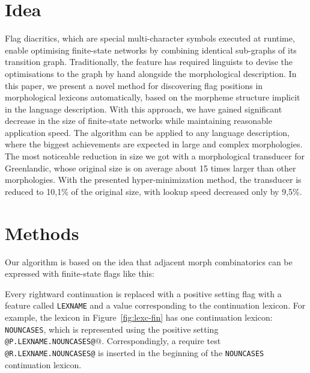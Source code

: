 \documentclass[final]{beamer}
\author{Senka Drobac$^1$, \\ Krister Lind\'{e}n$^1$, \\ Miikka Silfverberg$^1$, \\ Tommi A Pirinen$^2$}
\institute{$^1$University of Helsinki \\ Department of Modern Languages, PO Box 24 %
\\ $^2$University of Helsinki \\ Department of Speech Sciences, PO Box 9}
\begin{document}
\begin{poster}


\newcolumn


\section{Idea}
\justifying
Flag diacritics, which are special multi-character symbols executed at runtime, enable optimising finite-state networks by
    combining identical sub-graphs of its transition
    graph. Traditionally, the feature has required linguists to devise
    the optimisations to the graph by hand alongside the morphological
    description. In this paper, we present a novel method for
    discovering flag positions in morphological lexicons automatically,
    based on the morpheme structure implicit in the language
    description. With this approach, we have gained significant
    decrease in the size of finite-state networks while maintaining reasonable application 
    speed. The algorithm can be applied to any language description, where the biggest achievements are expected in large and complex morphologies. The most noticeable reduction in size we got with a morphological transducer for Greenlandic, whose original size is on average about 15 times larger than other morphologies. With the presented hyper-minimization method, the transducer is reduced to 10,1\% of the original size, with lookup speed decreased only by 9,5\%. 

\section{Methods}
\justifying
Our algorithm is based on the idea that adjacent morph combinatorics can be expressed with finite-state flags like this:

Every rightward continuation is replaced with a positive setting flag
with a feature called \texttt{LEXNAME} and a value corresponding to the
continuation lexicon. For example, the lexicon in
Figure~\ref{fig:lexc-fin} has one continuation lexicon: \texttt{NOUNCASES}, which is represented using the positive setting \verb+@P.LEXNAME.NOUNCASES@+@. Correspondingly, a require test \verb+@R.LEXNAME.NOUNCASES@+ is inserted in the beginning of the \texttt{NOUNCASES} continuation lexicon.

\end{poster}
\end{document}

